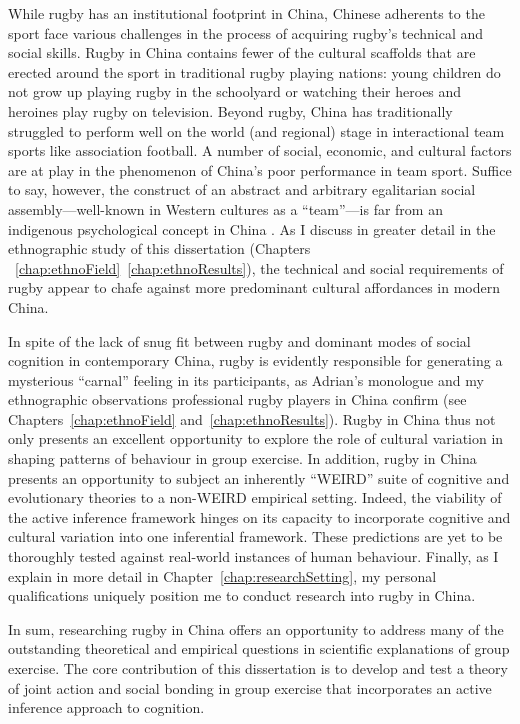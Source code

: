 \begin{CJK}{UTF8}{gbsn}
While rugby has an institutional footprint in China, Chinese adherents to the sport face various challenges in the process of acquiring rugby's technical and social skills.  Rugby in China contains fewer of the cultural scaffolds that are erected around the sport in traditional rugby playing nations: young children do not grow up playing rugby in the schoolyard or watching their heroes and heroines play rugby on television.  Beyond rugby, China has traditionally struggled to perform well on the world (and regional) stage in interactional team sports like association football.  A number of social, economic, and cultural factors are at play in the phenomenon of China's poor performance in team sport.  Suffice to say, however, the construct of an abstract and arbitrary egalitarian social assembly---well-known in Western cultures as a ``team''---is far from an indigenous psychological concept in China \cite[instead, the family functions as a primary metaphor for social interaction][]{Liu2009}.  As I discuss in greater detail in the ethnographic study of this dissertation (Chapters ~\ref{chap:ethnoField}\nobreakdash~\ref{chap:ethnoResults}), the technical and social requirements of rugby appear to chafe against more predominant cultural affordances in modern China.

In spite of the lack of snug fit between rugby and dominant modes of social cognition in contemporary China, rugby is evidently responsible for generating a mysterious ``carnal'' feeling in its participants, as Adrian's monologue and my ethnographic observations professional rugby players in China confirm (see Chapters~\ref{chap:ethnoField} and~\ref{chap:ethnoResults}).  Rugby in China thus not only presents an excellent opportunity to explore the role of cultural variation in shaping patterns of behaviour in group exercise.  In addition, rugby in China presents an opportunity to subject an inherently ``WEIRD'' \citep[Western, Educated, Industrial, Rich, and Democratic; cf.][]{Henrich2010d} suite of cognitive and evolutionary theories to a non-WEIRD empirical setting.  Indeed, the viability of the active inference framework hinges on its capacity to incorporate cognitive and cultural variation into one inferential framework.  These predictions are yet to be thoroughly tested against real-world instances of human behaviour.  Finally, as I explain in more detail in Chapter~\ref{chap:researchSetting}, my personal qualifications uniquely position me to conduct research into rugby in China.

In sum, researching rugby in China offers an opportunity to address many of the outstanding theoretical and empirical questions in scientific explanations of group exercise.  The core contribution of this dissertation is to develop and test a theory of joint action and social bonding in group exercise that incorporates an active inference approach to cognition.




\end{CJK}
